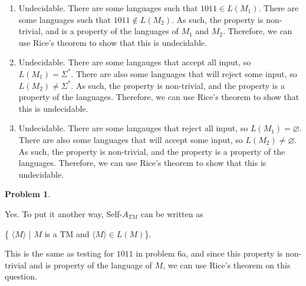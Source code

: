 \documentclass[11pt]{article}
\theoremstyle{definition}
\theoremstyle{case}
\theoremstyle{theorem}
\newtheorem{prob}{Problem}
\begin{document}
\begin{enumerate}[label=(\alph*)]

\item Undecidable. There are some languages such that $1011 \in L(M_1)$. 
There are some languages such that $1011 \notin L(M_2)$. As such, the property is non-trivial,
and is a property of the languages of $M_1$ and $M_2$. Therefore, we can use Rice's theorem
to show that this is undecidable.

\item Undecidable. There are some langauges that accept all input, so $L(M_1) = \Sigma^*$. 
There are also some languages that will reject some input, so $L(M_2) \neq \Sigma^*$. As such,
the property is non-trivial, and the property is a property of the languages. Therefore,
we can use Rice's theorem to show that this is undecidable.

\item Undecidable. There are some langauges that reject all input, so $L(M_1) = \varnothing$. 
There are also some languages that will accept some input, so $L(M_2) \neq \varnothing$. As such,
the property is non-trivial, and the property is a property of the languages. Therefore,
we can use Rice's theorem to show that this is undecidable.

\end{enumerate}

\begin{prob}\end{prob}

Yes. To put it another way, Self-$A_{TM}$ can be written as 

\{ $\langle M \rangle$ | $M$ is a TM and $\langle M \rangle \in L(M)$\}.

This is the same as testing for $1011$ in problem 6a, and since this property is non-trivial 
and is property of the language of $M$, we can use Rice's theorem on this question.
\end{document}
